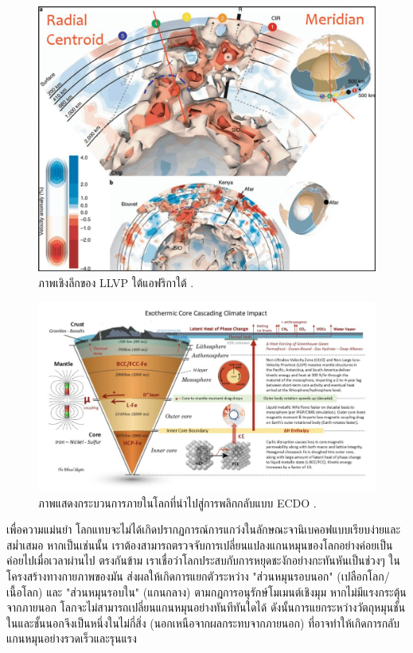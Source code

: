 \documentclass[10pt,twocolumn,letterpaper]{article}
\begin{document}
\begin{figure}[t]
\begin{center}
   \includegraphics[width=1\linewidth]{llvp.jpg}
\end{center}
   \caption{ภาพเชิงลึกของ LLVP ใต้แอฟริกาใต้ \cite{28}.}
\label{fig:12}
\label{fig:onecol}
\end{figure}

\begin{figure}[t]
\begin{center}
\includegraphics[width=1\textwidth]{layers.jpg}
\end{center}
   \caption{ภาพแสดงกระบวนการภายในโลกที่นำไปสู่การพลิกกลับแบบ ECDO \cite{129}.}
\label{fig:11}
\end{figure}

เพื่อความแม่นยำ โลกแทบจะไม่ได้เกิดปรากฏการณ์การแกว่งในลักษณะจานิเบคอฟแบบเรียบง่ายและสม่ำเสมอ หากเป็นเช่นนั้น เราต้องสามารถตรวจจับการเปลี่ยนแปลงแกนหมุนของโลกอย่างค่อยเป็นค่อยไปเมื่อเวลาผ่านไป ตรงกันข้าม เราเชื่อว่าโลกประสบกับการหยุดชะงักอย่างกะทันหันเป็นช่วงๆ ในโครงสร้างทางกายภาพของมัน ส่งผลให้เกิดการแยกตัวระหว่าง "ส่วนหมุนรอบนอก" (เปลือกโลก/ เนื้อโลก) และ "ส่วนหมุนรอบใน" (แกนกลาง) ตามกฎการอนุรักษ์โมเมนต์เชิงมุม หากไม่มีแรงกระตุ้นจากภายนอก โลกจะไม่สามารถเปลี่ยนแกนหมุนอย่างทันทีทันใดได้ ดังนั้นการแยกระหว่างวัตถุหมุนชั้นในและชั้นนอกจึงเป็นหนึ่งในไม่กี่สิ่ง (นอกเหนือจากผลกระทบจากภายนอก) ที่อาจทำให้เกิดการกลับแกนหมุนอย่างรวดเร็วและรุนแรง
\end{document}
